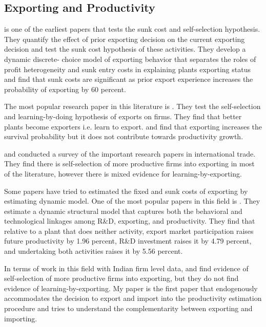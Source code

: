 \documentclass[12pt]{article}
\begin{document}
\subsection*{Exporting and Productivity}

\textcite{roberts1997decision} is one of the earliest papers that
tests the sunk cost and self-selection hypothesis. They quantify the effect of prior exporting
decision on the current exporting decision and test the sunk cost
hypothesis of these activities.  They  develop a dynamic discrete-
 choice model of exporting behavior that separates the roles of profit heterogeneity
 and sunk entry costs in explaining plants exporting status and find
 that sunk costs are significant as prior export experience increases
 the probability of exporting by 60 percent.  

The most popular research paper in this literature is
\textcite{bernard1999exceptional}. They test the self-selection and
 learning-by-doing hypothesis of exports on firms. They find that better
 plants become exporters i.e. learn to export. and find that exporting
 increases the survival probability but it does not contribute towards
 productivity growth.  

\textcite{wagner2007exports} and \textcite{wagner2012international}
conducted a survey of the important research papers in international
trade. They find  there is self-selection of more productive
firms into exporting in most of the literature, however there is mixed evidence for
learning-by-exporting.  


Some papers have tried to estimated the fixed and sunk costs of
exporting by estimating dynamic model. One of the most popular papers
in this field is \textcite{aw2011}. They estimate a dynamic structural model that captures both the behavioral
and technological linkages among R\&D, exporting, and
productivity. They find that relative to a
plant that does neither activity, export market participation raises future productivity
by 1.96 percent, R\&D investment raises it by 4.79 percent, and undertaking both
activities raises it by 5.56 percent. 

In terms of work in this field with Indian firm level data,
\textcite{haidar2012trade} and \textcite{gupta2018exporting} find evidence of
self-selection of more productive firms into exporting, but they do
not find evidence of learning-by-exporting. My paper is the first
paper that endogenously accommodates the decision to export and import
into the productivity estimation procedure and tries to understand the
complementarity between exporting and importing. 
\end{document}
